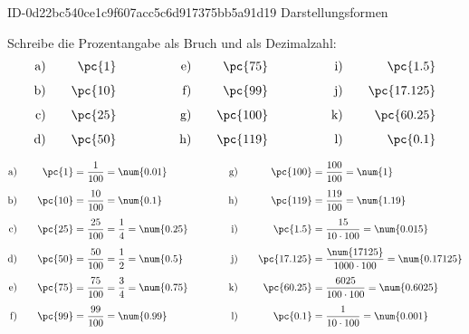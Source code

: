 \begin{exercise}
      {ID-0d22bc540ce1c9f607acc5c6d917375bb5a91d19}
      {Darstellungsformen}
  \ifproblem\problem\par
    Schreibe die Prozentangabe als Bruch und als Dezimalzahl:
    \begin{alignat*}{6}
      \text{a)}&\quad & \text{\pc{1}}&\qquad\qquad  & \text{e)}&\quad & \text{\pc{75}}&\qquad\qquad  & \text{i)}&\quad & \text{\pc{1.5}}&    \\[1ex]
      \text{b)}&\quad & \text{\pc{10}}&\qquad\qquad & \text{f)}&\quad & \text{\pc{99}}&\qquad\qquad  & \text{j)}&\quad & \text{\pc{17.125}}& \\[1ex]
      \text{c)}&\quad & \text{\pc{25}}&\qquad\qquad & \text{g)}&\quad & \text{\pc{100}}&\qquad\qquad & \text{k)}&\quad & \text{\pc{60.25}}&  \\[1ex]
      \text{d)}&\quad & \text{\pc{50}}&\qquad\qquad & \text{h)}&\quad & \text{\pc{119}}&\qquad\qquad & \text{l)}&\quad & \text{\pc{0.1}}&
    \end{alignat*}
  \fi
  \ifoutcome\outcome\par
    \begin{alignat*}{4}
      \text{a)}&\quad & \text{\pc{1}}&=\frac{1}{100}=\num{0.01}               & \qquad\quad\text{g)}&\quad & \text{\pc{100}}&=\frac{100}{100}=\num{1}                           \\[1ex]
      \text{b)}&\quad & \text{\pc{10}}&=\frac{10}{100}=\num{0.1}              & \qquad\quad\text{h)}&\quad & \text{\pc{119}}&=\frac{119}{100}=\num{1.19}                        \\[1ex]
      \text{c)}&\quad & \text{\pc{25}}&=\frac{25}{100}=\frac{1}{4}=\num{0.25} & \qquad\quad\text{i)}&\quad & \text{\pc{1.5}}&=\frac{15}{10\cdot100}=\num{0.015}                 \\[1ex]
      \text{d)}&\quad & \text{\pc{50}}&=\frac{50}{100}=\frac{1}{2}=\num{0.5}  & \qquad\quad\text{j)}&\quad & \text{\pc{17.125}}&=\frac{\num{17125}}{1000\cdot100}=\num{0.17125} \\[1ex]
      \text{e)}&\quad & \text{\pc{75}}&=\frac{75}{100}=\frac{3}{4}=\num{0.75} & \qquad\quad\text{k)}&\quad & \text{\pc{60.25}}&=\frac{6025}{100\cdot100}=\num{0.6025}           \\[1ex]
      \text{f)}&\quad & \text{\pc{99}}&=\frac{99}{100}=\num{0.99}             & \qquad\quad\text{l)}&\quad & \text{\pc{0.1}}&=\frac{1}{10\cdot100}=\num{0.001}
    \end{alignat*}
  \fi
\end{exercise}
